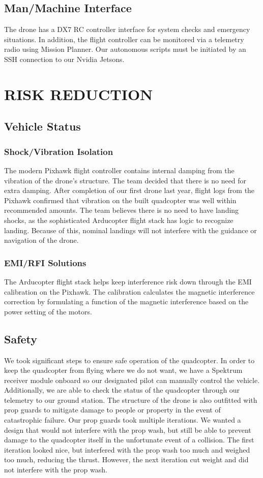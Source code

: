 \documentclass[12pt,letterpaper]{article}
\begin{document}
	\subsection*{Man/Machine Interface}
		The drone has a DX7 RC controller interface for system checks and emergency situations. In addition, the flight controller can be monitored via a telemetry radio using Mission Planner. Our autonomous scripts must be initiated by an SSH connection to our Nvidia Jetsons.

\section*{RISK REDUCTION}
	\subsection*{Vehicle Status}
		\subsubsection*{Shock/Vibration Isolation}
		The modern Pixhawk flight controller contains internal damping from the vibration of the drone's structure. The team decided that there is no need for extra damping. After completion of our first drone last year, flight logs from the Pixhawk confirmed that vibration on the built quadcopter was well within recommended amounts. The team believes there is no need to have landing shocks, as the sophisticated Arducopter flight stack has logic to recognize landing. Because of this, nominal landings will not interfere with the guidance or navigation of the drone.

		\subsubsection*{EMI/RFI Solutions}
		The Arducopter flight stack helps keep interference risk down through the EMI calibration on the Pixhawk. The calibration calculates the magnetic interference correction by formulating a function of the magnetic interference based on the power setting of the motors.


	\subsection*{Safety}
		We took significant steps to ensure safe operation of the quadcopter. In order to keep the quadcopter from flying where we do not want, we have a Spektrum receiver module onboard so our designated pilot can manually control the vehicle. Additionally, we are able to check the status of the quadcopter through our telemetry to our ground station. The structure of the drone is also outfitted with prop guards to mitigate damage to people or property in the event of catastrophic failure. Our prop guards took multiple iterations. We wanted a design that would not interfere with the prop wash, but still be able to prevent damage to the quadcopter itself in the unfortunate event of a collision. The first iteration looked nice, but interfered with the prop wash too much and weighed too much, reducing the thrust. However, the next iteration cut weight and did not interfere with the prop wash.
\end{document}
